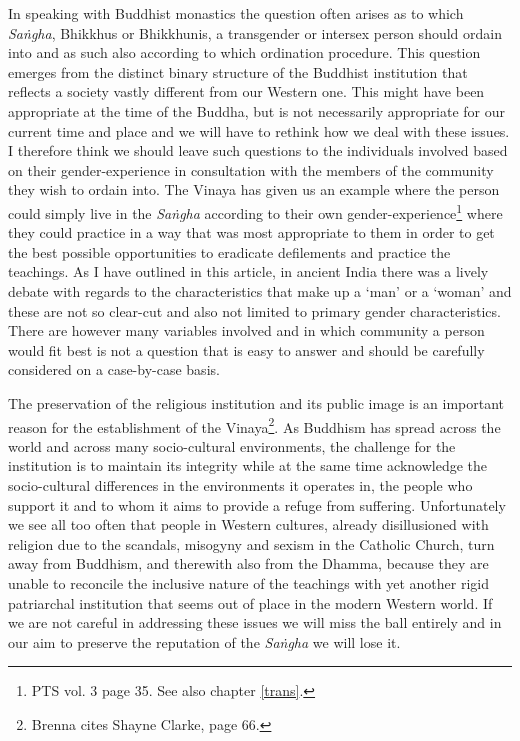 In speaking with Buddhist monastics the question often arises as to which {\em Saṅgha}, Bhikkhus or Bhikkhunis, a transgender or intersex person should ordain into and as such also according to which ordination procedure. This question emerges from the distinct binary structure of the Buddhist institution that reflects a society vastly different from our Western one. This might have been appropriate at the time of the Buddha, but is not necessarily appropriate for our current time and place and we will have to rethink how we deal with these issues. I therefore think we should leave such questions to the individuals involved based on their gender-experience in consultation with the members of the community they wish to ordain into. The Vinaya has given us an example where the person could simply live in the {\em Saṅgha} according to their own gender-experience\footnote{PTS vol. 3 page 35. See also chapter \ref{trans}.} where they could practice in a way that was most appropriate to them in order to get the best possible opportunities to eradicate defilements and practice the teachings. As I have outlined in this article, in ancient India there was a lively debate with regards to the characteristics that make up a `man' or a `woman' and these are not so clear-cut and also not limited to primary gender characteristics. There are however many variables involved and in which community a person would fit best is not a question that is easy to answer and should be carefully considered on a case-by-case basis. 

The preservation of the religious institution and its public image is an important reason for the establishment of the Vinaya\footnote{Brenna \cite{artinger} cites Shayne Clarke, page 66.}. As Buddhism has spread across the world and across many socio-cultural environments, the challenge for the institution is to maintain its integrity while at the same time acknowledge the socio-cultural differences in the environments it operates in, the people who support it and to whom it aims to provide a refuge from suffering. Unfortunately we see all too often that people in Western cultures, already disillusioned with religion due to the scandals, misogyny and sexism in the Catholic Church, turn away from Buddhism, and therewith also from the Dhamma, because they are unable to reconcile the inclusive nature of the teachings with yet another rigid patriarchal institution that seems out of place in the modern Western world. If we are not careful in addressing these issues we will miss the ball entirely and in our aim to preserve the reputation of the {\em Saṅgha} we will lose it.

